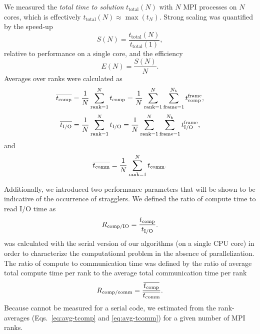 We measured the \emph{total time to solution} $t_{\text{total}}(N)$ with $N$ MPI processes on $N$ cores, which is effectively
$t_{\text{total}}(N) \approx \max(t_{N})$. 
Strong scaling was quantified by the speed-up
\begin{equation}
  \label{eq:speedup}
  S(N) = \frac{t_{\text{total}}(N)}{t_{\text{total}}(1)},
\end{equation}
relative to performance on a single core, and the efficiency
\begin{equation}
  \label{eq:efficiency}
  E(N) = \frac{S(N)}{N}.
\end{equation}
Averages over ranks were calculated as
\begin{equation}
  \label{eq:avg-tcomp}
  \overline{{t}_{\text{comp}}} = \frac{1}{N}
  \sum_{\text{rank}=1}^{N}{t}_{\text{comp}} = \frac{1}{N}\sum_{\text{rank}=1}^{N}\sum_{\text{frame}=1}^{N_\text{b}}{t}_{\text{comp}}^{\text{frame}},
\end{equation}
\begin{equation}
  \label{eq:avg-tIO}
  \overline{{t}_{\text{I/O}}} = \frac{1}{N}\sum_{\text{rank}=1}^{N}{t}_{\text{I/O}} = \frac{1}{N}\sum_{\text{rank}=1}^{N}\sum_{\text{frame}=1}^{N_{\text{b}}}{t}_{\text{I/O}}^{\text{frame}},
\end{equation}
and
\begin{equation}
  \label{eq:avg-tcomm}
  \overline{t_{\text{comm}}} = \frac{1}{N}\sum_{\text{rank}=1}^{N}t_{\text{comm}}.
\end{equation}

Additionally, we introduced two performance parameters that will be shown to be indicative of the occurrence of stragglers.
We defined the ratio of compute time to read I/O time as
\begin{equation}
  R_{\text{comp/IO}} = \frac{{t}_{\text{comp}}}{{t}_{\text{I/O}}}.
  \label{eq:Compute-IO}
\end{equation}
\RcompIO was calculated with the serial version of our algorithms (on a single CPU core) in order to characterize the computational problem in the absence of parallelization.
The ratio of compute to communication time was defined by the ratio of average total compute time per rank to the average total communication time per rank  
\begin{equation}
  \label{eq:Compute-comm}
  R_{\text{comp/comm}} = \frac{\overline{{t}_{\text{comp}}}}{\overline{t_{\text{comm}}}}.
\end{equation}
Because \tcomm cannot be measured for a serial code, we estimated \Rcompcomm from the rank-averages (Eqs.~\ref{eq:avg-tcomp} and \ref{eq:avg-tcomm}) for a given number of MPI ranks.

